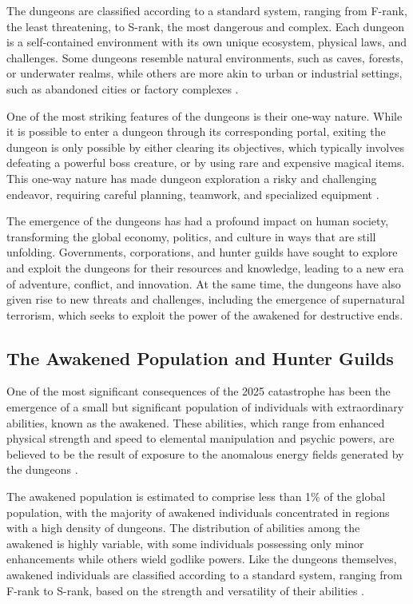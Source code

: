 \documentclass[12pt, a4paper]{article}
\begin{document}
The dungeons are classified according to a standard system, ranging from F-rank, the least threatening, to S-rank, the most dangerous and complex. Each dungeon is a self-contained environment with its own unique ecosystem, physical laws, and challenges. Some dungeons resemble natural environments, such as caves, forests, or underwater realms, while others are more akin to urban or industrial settings, such as abandoned cities or factory complexes \citep{Nakano2027}.

One of the most striking features of the dungeons is their one-way nature. While it is possible to enter a dungeon through its corresponding portal, exiting the dungeon is only possible by either clearing its objectives, which typically involves defeating a powerful boss creature, or by using rare and expensive magical items. This one-way nature has made dungeon exploration a risky and challenging endeavor, requiring careful planning, teamwork, and specialized equipment \citep{Iwasaki2026}.

The emergence of the dungeons has had a profound impact on human society, transforming the global economy, politics, and culture in ways that are still unfolding. Governments, corporations, and hunter guilds have sought to explore and exploit the dungeons for their resources and knowledge, leading to a new era of adventure, conflict, and innovation. At the same time, the dungeons have also given rise to new threats and challenges, including the emergence of supernatural terrorism, which seeks to exploit the power of the awakened for destructive ends.

\subsection{The Awakened Population and Hunter Guilds}
One of the most significant consequences of the 2025 catastrophe has been the emergence of a small but significant population of individuals with extraordinary abilities, known as the awakened. These abilities, which range from enhanced physical strength and speed to elemental manipulation and psychic powers, are believed to be the result of exposure to the anomalous energy fields generated by the dungeons \citep{Nakamura2026}.

The awakened population is estimated to comprise less than 1\% of the global population, with the majority of awakened individuals concentrated in regions with a high density of dungeons. The distribution of abilities among the awakened is highly variable, with some individuals possessing only minor enhancements while others wield godlike powers. Like the dungeons themselves, awakened individuals are classified according to a standard system, ranging from F-rank to S-rank, based on the strength and versatility of their abilities \citep{Kim2027}.
\end{document}
